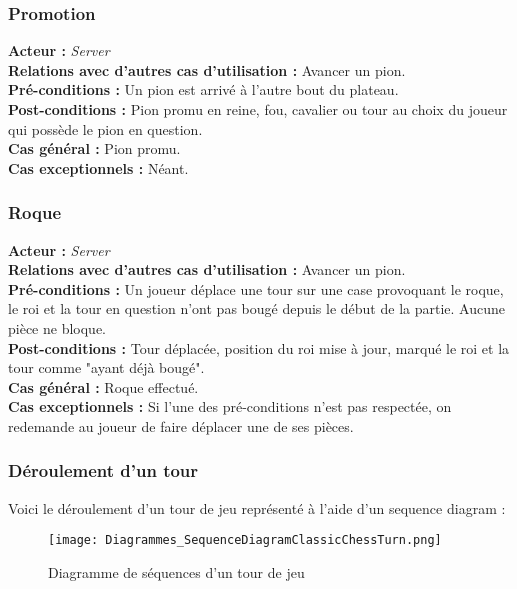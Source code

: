 \documentclass[10pt, a4paper]{article}
\begin{document}
\subsubsection{Promotion}
\textbf{Acteur :} \textit{Server} \\
\textbf{Relations avec d'autres cas d'utilisation :} Avancer un pion. \\
\textbf{Pré-conditions :} Un pion est arrivé à l'autre bout du plateau. \\
\textbf{Post-conditions :} Pion promu en reine, fou, cavalier ou tour au choix du joueur qui possède le pion en question. \\
\textbf{Cas général :} Pion promu. \\
\textbf{Cas exceptionnels :} Néant. \\

\subsubsection{Roque}
\textbf{Acteur :} \textit{Server} \\
\textbf{Relations avec d'autres cas d'utilisation :} Avancer un pion. \\
\textbf{Pré-conditions :} Un joueur déplace une tour sur une case provoquant le roque, le roi et la tour en question n'ont pas bougé depuis le début de la partie. Aucune pièce ne bloque. \\
\textbf{Post-conditions :} Tour déplacée, position du roi mise à jour, marqué le roi et la tour comme "ayant déjà bougé". \\
\textbf{Cas général :} Roque effectué. \\
\textbf{Cas exceptionnels :} Si l'une des pré-conditions n'est pas respectée, on redemande au joueur de faire déplacer une de ses pièces. \\

\subsubsection{Déroulement d'un tour}
Voici le déroulement d'un tour de jeu représenté à l'aide d'un sequence diagram : \\

\begin{figure}
\texttt{[image: Diagrammes\_SequenceDiagramClassicChessTurn.png]}
\caption{Diagramme de séquences d'un tour de jeu}
\label{CD} %
\end{figure}
\end{document}
